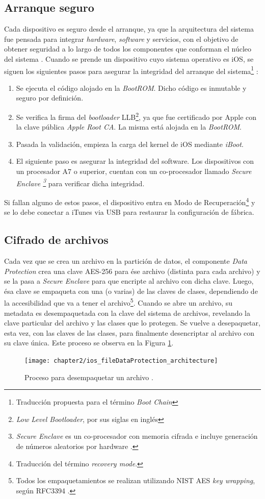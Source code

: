 \subsection{Arranque seguro}\label{fig:ch02:arranque}
Cada dispositivo es seguro desde el arranque, ya que la arquitectura del sistema fue pensada para integrar \textit{hardware}, \textit{software} y servicios, con el objetivo de obtener seguridad a lo largo de todos los componentes que conforman el núcleo del sistema \cite{asg}. Cuando se prende un dispositivo cuyo sistema operativo es iOS, se siguen los siguientes pasos para asegurar la integridad del arranque del sistema\footnote{Traducción propuesta para el término \textit{Boot Chain}} :
\begin{enumerate}
	\item Se ejecuta el código alojado en la \textit{BootROM}. Dicho código es inmutable y seguro por definición.
	\item Se verifica la firma del \textit{bootloader} LLB\footnote{\textit{Low Level Bootloader}, por sus siglas en inglés}, ya que fue certificado por Apple con la clave pública \textit{Apple Root CA}. La misma está alojada en la \textit{BootROM}. 
	\item Pasada la validación, empieza la carga del kernel de iOS mediante \textit{iBoot}.
	\item El siguiente paso es asegurar la integridad del software. Los dispositivos con un procesador A7 o superior, cuentan con un co-procesador llamado \textit{Secure Enclave \footnote{\textit{Secure Enclave} es un co-procesador con memoria cifrada e incluye generación de números aleatorios por hardware \cite{asg}.}} para verificar dicha integridad.
\end{enumerate}
Si fallan alguno de estos pasos, el dispositivo entra en Modo de Recuperación\footnote{Traducción del término \textit{recovery mode}.} y se lo debe conectar a iTunes via USB para restaurar la configuración de fábrica.\\
\subsection{Cifrado de archivos}
Cada vez que se crea un archivo en la partición de datos, el componente \textit{Data Protection} crea una clave AES-256 para ése archivo (distinta para cada archivo) y se la pasa a \textit{Secure Enclave} para que encripte al archivo con dicha clave. Luego, ésa clave se empaqueta con una (o varias) de las claves de clases, dependiendo de la accesibilidad que va a tener el archivo\footnote{Todos los empaquetamientos se realizan utilizando NIST AES \textit{key wrapping}, según RFC3394 \cite{asg}.}.
Cuando se abre un archivo, su metadata es desempaquetada con la clave del sistema de archivos, revelando la clave particular del archivo y las clases que lo protegen. Se vuelve a desepaquetar, esta vez, con las claves de las clases, para finalmente desencriptar al archivo con su clave única. Este proceso se observa en la Figura \ref{fig:ch02:dataProtection}.
\begin{figure}[hbtp]
    \centering
    \texttt{[image: chapter2/ios\_fileDataProtection\_architecture]}
    \caption{Proceso para desempaquetar un archivo \cite{asg}.}
    \label{fig:ch02:dataProtection}
\end{figure}
